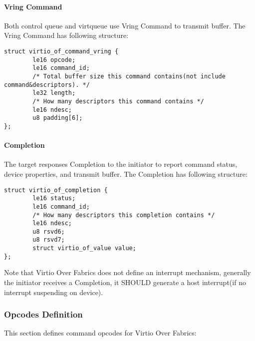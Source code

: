 \paragraph{Vring Command}\label{sec:Virtio Transport Options / Virtio Over Fabrics / Transmission Protocol / Commands Definition / Vring Command}

Both control queue and virtqueue use Vring Command to transmit buffer. The Vring Command has following structure:

\begin{lstlisting}
struct virtio_of_command_vring {
        le16 opcode;
        le16 command_id;
        /* Total buffer size this command contains(not include command&descriptors). */
        le32 length;
        /* How many descriptors this command contains */
        le16 ndesc;
        u8 padding[6];
};
\end{lstlisting}

\paragraph{Completion}\label{sec:Virtio Transport Options / Virtio Over Fabrics / Transmission Protocol / Commands Definition / Completion}

The target responses Completion to the initiator to report command status, device properties, and transmit buffer. The Completion has following structure:

\begin{lstlisting}
struct virtio_of_completion {
        le16 status;
        le16 command_id;
        /* How many descriptors this completion contains */
        le16 ndesc;
        u8 rsvd6;
        u8 rsvd7;
        struct virtio_of_value value;
};
\end{lstlisting}

Note that Virtio Over Fabrics does not define an interrupt mechanism, generally the initiator receives a Completion, it SHOULD generate a host interrupt(if no interrupt suspending on device).

\subsubsection{Opcodes Definition}\label{sec:Virtio Transport Options / Virtio Over Fabrics / Transmission Protocol / Opcodes Definition}
This section defines command opcodes for Virtio Over Fabrics:

